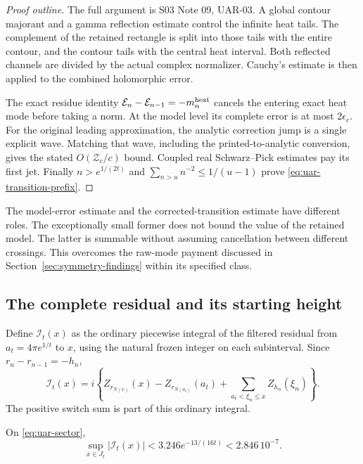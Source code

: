 \begin{proof}[Proof outline]
The full argument is
{S03 Note 09, UAR-03}. A global contour majorant and a gamma
reflection estimate control the infinite heat tails. The complement
of the retained rectangle is split into those tails with the entire
contour, and the contour tails with the central heat interval.
Both reflected channels are divided by the actual complex normalizer.
Cauchy's estimate is then applied to the combined holomorphic error.

The exact residue identity
$\mathcal E_n-\mathcal E_{n-1}=-m_n^{\rm heat}$ cancels the entering
exact heat mode before taking a norm. At the model level its complete
error is at most $2\epsilon_c$. For the original leading approximation,
the analytic correction jump is a single explicit wave. Matching that
wave, including the printed-to-analytic conversion, gives the stated
$O(\mathcal Z_c/c)$ bound. Coupled real Schwarz--Pick estimates pay
its first jet. Finally $n>e^{1/(2t)}$ and
$\sum_{n>u}n^{-2}\le1/(u-1)$ prove
\eqref{eq:uar-transition-prefix}.
\end{proof}

The model-error estimate and the corrected-transition estimate have
different roles. The exceptionally small former does not bound the
value of the retained model. The latter is summable without assuming
cancellation between different crossings. This overcomes the raw-mode
payment discussed in Section~\ref{sec:symmetry-findings} within its
specified class.

\subsection{The complete residual and its starting height}

Define $\mathcal I_t(x)$ as the ordinary piecewise integral of the
filtered residual from $a_t=4\pi e^{1/t}$ to $x$, using the natural
frozen integer on each subinterval. Since $r_n-r_{n-1}=-h_n$,
\begin{equation}\label{eq:uar-telescoping}
 \mathcal I_t(x)=i\left\{
 Z_{r_{N(x)}}(x)-Z_{r_{N(a_t)}}(a_t)
 +\sum_{a_t<\xi_n\le x}Z_{h_n}(\xi_n)\right\}.
\end{equation}
The positive switch sum is part of this ordinary integral.

\begin{theorem}
\label{thm:uar-complete}
On \eqref{eq:uar-sector},
\[
 \sup_{x\in J_t}|\mathcal I_t(x)|
 <3.246e^{-13/(16t)}<2.846\,10^{-7}.
\]
\end{theorem}

